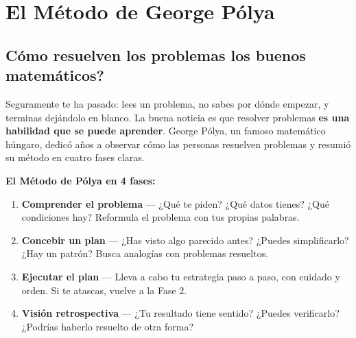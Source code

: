 \documentclass[12pt, a4paper]{article}
\begin{document}
\newpage

\section{El Método de George Pólya}

\subsection{\textquestiondown Cómo resuelven los problemas los buenos matemáticos?}

Seguramente te ha pasado: lees un problema, no sabes por dónde empezar, y terminas dejándolo en blanco. La buena noticia es que resolver problemas \textbf{es una habilidad que se puede aprender}. George Pólya, un famoso matemático húngaro, dedicó años a observar cómo las personas resuelven problemas y resumió su método en cuatro fases claras.

\begin{cuadroteoria}
\textbf{El Método de Pólya en 4 fases:}
\begin{enumerate}[label=\textbf{Fase \arabic*:}, leftmargin=*]
  \item \textbf{Comprender el problema} — ¿Qué te piden? ¿Qué datos tienes? ¿Qué condiciones hay? Reformula el problema con tus propias palabras.
  \item \textbf{Concebir un plan} — ¿Has visto algo parecido antes? ¿Puedes simplificarlo? ¿Hay un patrón? Busca analogías con problemas resueltos.
  \item \textbf{Ejecutar el plan} — Lleva a cabo tu estrategia paso a paso, con cuidado y orden. Si te atascas, vuelve a la Fase 2.
  \item \textbf{Visión retrospectiva} — ¿Tu resultado tiene sentido? ¿Puedes verificarlo? ¿Podrías haberlo resuelto de otra forma?
\end{enumerate}
\end{cuadroteoria}
\end{document}

